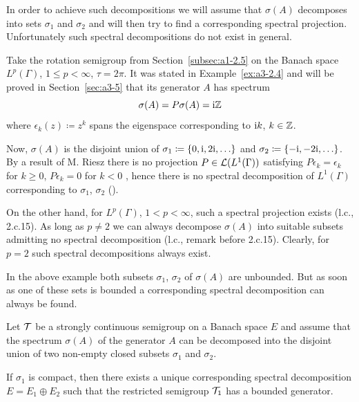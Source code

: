 In order to achieve such decompositions we will assume that $\sigma(A)$ decomposes into sets $\sigma_{1}$ and $\sigma_{2}$ and will then try to find a corresponding spectral projection.
Unfortunately such spectral decompositions do not exist in general.
\begin{example}\label{ex:a3-3.2}
Take the rotation semigroup from Section~\ref{subsec:a1-2.5} on the Banach space $L^{p}(\Gamma)$, $1 \leq p < \infty$, $\tau = 2\pi$.
It was stated in Example~\ref{ex:a3-2.4} and will be proved in Section~\ref{sec:a3-5} that its generator $A$ has spectrum
\[
\sigma(A) = P\sigma(A) = \mathrm{i}\mathbb{Z}
\]
where $\epsilon_{k}(z) \coloneq z^{k}$ spans the eigenspace corresponding to $\mathrm{i} k$, $k \in \mathbb{Z}$.

Now, $\sigma(A)$ is the disjoint union of $\sigma_{1} \coloneq \{0,\mathrm{i} ,2\mathrm{i}, \ldots\}$ 
and $\sigma_{2} \coloneq \{-\mathrm{i}, -2\mathrm{i}, \ldots\}$.
By a result of M. Riesz there is no projection $P \in \mathcal{L}(L^{1}(\Gamma))$ satisfying $P\epsilon_{k} = \epsilon_{k}$ for $k \geq 0$, $P\epsilon_{k} = 0$ for $k < 0$ , hence there is no spectral decomposition of\/ $L^{1}(\Gamma)$ corresponding to $\sigma_{1}$, $\sigma_{2}$ (\textcite[p.165]{lindenstraustzafriri:1979}).

On the other hand, for $L^{p}(\Gamma)$, $1 < p < \infty$, such a spectral projection exists (l.c., 2.c.15).
As long as $p \neq 2$ we can always decompose $\sigma(A)$ into suitable subsets admitting no spectral decomposition (l.c., remark before 2.c.15).
Clearly, for $p = 2$ such spectral decompositions always exist.
\end{example}
In the above example both subsets $\sigma_{1}$, $\sigma_{2}$ of\/ $\sigma(A)$ are unbounded.
But as soon as one of these sets is bounded a corresponding spectral decomposition can always be found.
\begin{theorem}\label{thm:a3-3.3}
Let $\mathcal{T}$ be a strongly continuous semigroup on a Banach space $E$ and assume that the spectrum $\sigma(A)$ of the generator $A$ can be decomposed into the disjoint union of two non-empty closed subsets $\sigma_{1}$ and 
$\sigma_{2}$.

If\/ $\sigma_{1}$ is compact, then there exists a unique corresponding spectral decomposition $E = E_{1} \oplus E_{2}$ such that the restricted semigroup $\mathcal{T}_{1}$ has a bounded generator.
\end{theorem}
